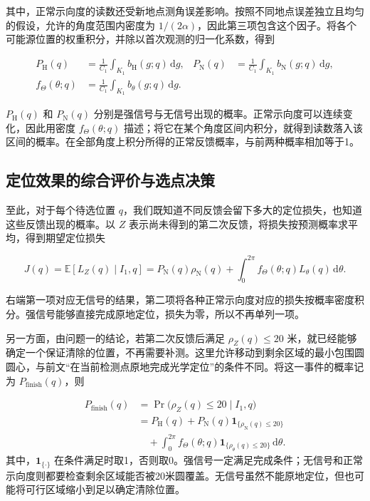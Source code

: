 \documentclass[UTF8,a4paper,zihao=-4,fontset=none]{ctexart}
\begin{document}
其中，正常示向度的读数还受新地点测角误差影响。按照不同地点误差独立且均匀的假设，允许的角度范围内密度为 \(1/(2\alpha)\)，因此第三项包含这个因子。将各个可能源位置的权重积分，并除以首次观测的归一化系数，得到

\begin{equation}
\begin{aligned}
 P_{\mathrm H}(q)&=\frac{1}{C_1}\int_{K_1}b_{\mathrm H}(g;q)\,\mathrm dg,
 &P_{\mathrm N}(q)&=\frac{1}{C_1}\int_{K_1}b_{\mathrm N}(g;q)\,\mathrm dg,\\
 f_\Theta(\theta;q)&=\frac{1}{C_1}\int_{K_1}b_\theta(g;q)\,\mathrm dg.
\end{aligned}
\label{eq:q2-pair-prediction}
\end{equation}

\(P_{\mathrm H}(q)\) 和 \(P_{\mathrm N}(q)\) 分别是强信号与无信号出现的概率。正常示向度可以连续变化，因此用密度 \(f_\Theta(\theta;q)\) 描述；将它在某个角度区间内积分，就得到读数落入该区间的概率。在全部角度上积分所得的正常反馈概率，与前两种概率相加等于1。

\subsection{定位效果的综合评价与选点决策}

至此，对于每个待选位置 \(q\)，我们既知道不同反馈会留下多大的定位损失，也知道这些反馈出现的概率。以 \(Z\) 表示尚未得到的第二次反馈，将损失按预测概率求平均，得到期望定位损失

\begin{equation}
 J(q)=\mathbb E[L_Z(q)\mid I_1,q]
 =P_{\mathrm N}(q)\rho_{\mathrm N}(q)
 +\int_0^{2\pi}f_\Theta(\theta;q)L_\theta(q)\,\mathrm d\theta.
\label{eq:q2-pair-expected-objective}
\end{equation}

右端第一项对应无信号的结果，第二项将各种正常示向度对应的损失按概率密度积分。强信号能够直接完成原地定位，损失为零，所以不再单列一项。

另一方面，由问题一的结论，若第二次反馈后满足 \(\rho_Z(q)\le20\) 米，就已经能够确定一个保证清除的位置，不再需要补测。这里允许移动到剩余区域的最小包围圆圆心，与前文“在当前检测点原地完成光学定位”的条件不同。将这一事件的概率记为 \(P_{\mathrm{finish}}(q)\)，则

\begin{equation}
\begin{aligned}
 P_{\mathrm{finish}}(q)
 &=\Pr\bigl(\rho_Z(q)\le20\mid I_1,q\bigr)\\
 &=P_{\mathrm H}(q)+P_{\mathrm N}(q)\mathbf1_{\{\rho_{\mathrm N}(q)\le20\}}\\
 &\quad+\int_0^{2\pi}f_\Theta(\theta;q)\mathbf1_{\{\rho_\theta(q)\le20\}}\,\mathrm d\theta.
\end{aligned}
\label{eq:q2-completion-probability}
\end{equation}
其中，\(\mathbf1_{\{\cdot\}}\) 在条件满足时取1，否则取0。强信号一定满足完成条件；无信号和正常示向度则都要检查剩余区域能否被20米圆覆盖。无信号虽然不能原地定位，但也可能将可行区域缩小到足以确定清除位置。
\end{document}
